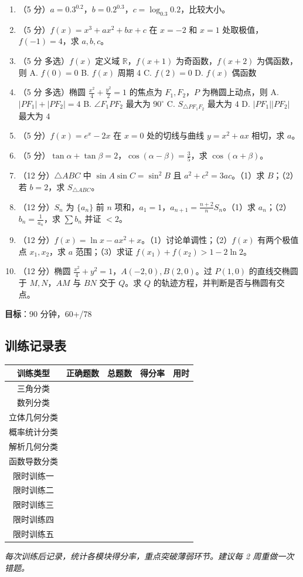 \begin{enumerate}
  \item（5 分）$a=0.3^{0.2}$，$b=0.2^{0.3}$，$c=\log_{0.3}0.2$，比较大小。
  \item（5 分）$f(x)=x^3+ax^2+bx+c$ 在 $x=-2$ 和 $x=1$ 处取极值，$f(-1)=4$，求 $a,b,c$。
  \item（5 分 多选）$f(x)$ 定义域 $\mathbb{R}$，$f(x+1)$ 为奇函数，$f(x+2)$ 为偶函数，则 A. $f(0)=0$ B. $f(x)$ 周期 4 C. $f(2)=0$ D. $f(x)$ 偶函数
  \item（5 分 多选）椭圆 $\frac{x^2}{4}+\frac{y^2}{2}=1$ 的焦点为 $F_1,F_2$，$P$ 为椭圆上动点，则 A. $|PF_1|+|PF_2|=4$ B. $\angle F_1PF_2$ 最大为 $90^\circ$ C. $S_{\triangle PF_1F_2}$ 最大为 $4$ D. $|PF_1||PF_2|$ 最大为 $4$
  \item（5 分）$f(x)=e^x-2x$ 在 $x=0$ 处的切线与曲线 $y=x^2+ax$ 相切，求 $a$。
  \item（5 分）$\tan\alpha+\tan\beta=2$，$\cos(\alpha-\beta)=\frac35$，求 $\cos(\alpha+\beta)$。
  \item（12 分）$\triangle ABC$ 中 $\sin A\sin C = \sin^2B$ 且 $a^2+c^2=3ac$。（1）求 $B$；（2）若 $b=2$，求 $S_{\triangle ABC}$。
  \item（12 分）$S_n$ 为 $\{a_n\}$ 前 $n$ 项和，$a_1=1$，$a_{n+1}=\frac{n+2}{n}S_n$。（1）求 $a_n$；（2）$b_n=\frac1{a_n}$，求 $\sum b_n$ 并证 $<2$。
  \item（12 分）$f(x)=\ln x - ax^2 + x$。（1）讨论单调性；（2）$f(x)$ 有两个极值点 $x_1,x_2$，求 $a$ 范围；（3）求证 $f(x_1)+f(x_2) > 1-2\ln2$。
  \item（12 分）椭圆 $\frac{x^2}{4}+y^2=1$，$A(-2,0),B(2,0)$。过 $P(1,0)$ 的直线交椭圆于 $M,N$，$AM$ 与 $BN$ 交于 $Q$。求 $Q$ 的轨迹方程，并判断是否与椭圆有交点。
\end{enumerate}

\textbf{目标}：90 分钟，60+/78

\subsection{训练记录表}

\begin{center}
\begin{tabular}{c|c|c|c|c}
\textbf{训练类型} & \textbf{正确题数} & \textbf{总题数} & \textbf{得分率} & \textbf{用时} \\ \hline
三角分类 & & & & \\
数列分类 & & & & \\
立体几何分类 & & & & \\
概率统计分类 & & & & \\
解析几何分类 & & & & \\
函数导数分类 & & & & \\
限时训练一 & & & & \\
限时训练二 & & & & \\
限时训练三 & & & & \\
限时训练四 & & & & \\
限时训练五 & & & & \\
\end{tabular}
\end{center}

\textit{每次训练后记录，统计各模块得分率，重点突破薄弱环节。建议每 2 周重做一次错题。}
